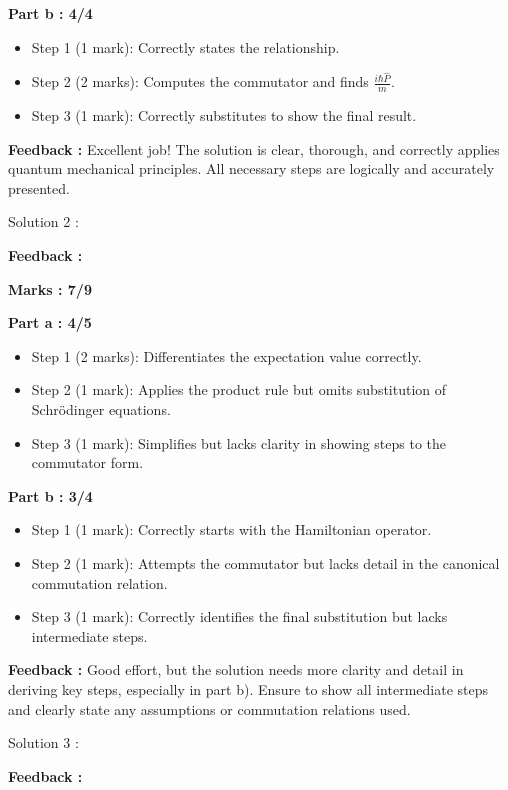 \documentclass[a4paper,11pt]{article}
\begin{document}
\textbf{Part b : 4/4}

\begin{itemize}
    \item Step 1 (1 mark): Correctly states the relationship.
    \item Step 2 (2 marks): Computes the commutator and finds $\frac{i\hbar \hat{P}}{m}$.
    \item Step 3 (1 mark): Correctly substitutes to show the final result.
\end{itemize}

\textbf{Feedback :}
Excellent job! The solution is clear, thorough, and correctly applies quantum mechanical principles. All necessary steps are logically and accurately presented.



Solution 2 :

\textbf{Feedback :}

\textbf{Marks : 7/9}

\textbf{Part a : 4/5}

\begin{itemize}
    \item Step 1 (2 marks): Differentiates the expectation value correctly.
    \item Step 2 (1 mark): Applies the product rule but omits substitution of Schrödinger equations.
    \item Step 3 (1 mark): Simplifies but lacks clarity in showing steps to the commutator form.
\end{itemize}


\textbf{Part b : 3/4}

\begin{itemize}
    \item Step 1 (1 mark): Correctly starts with the Hamiltonian operator.
    \item Step 2 (1 mark): Attempts the commutator but lacks detail in the canonical commutation relation.
    \item Step 3 (1 mark): Correctly identifies the final substitution but lacks intermediate steps.
\end{itemize}

\textbf{Feedback :}
Good effort, but the solution needs more clarity and detail in deriving key steps, especially in part b). Ensure to show all intermediate steps and clearly state any assumptions or commutation relations used.



Solution 3 :

\textbf{Feedback :}
\end{document}
